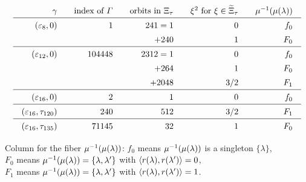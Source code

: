 \documentclass{amsart} %
\begin{document}
\begin{table}
\[
\setlength{\arraycolsep}{10pt}
\renewcommand{\arraystretch}{1.4}
\begin{array}{rrrrr}
\gamma &\textrm{index of $\vGam$} &\textrm{orbits in $\Xitau$} & \xi^2 \textrm{ for } \xi\in \tilXitau&\mu\inv(\mu(\lambda))\\
\hline 
(\vep_8, 0)     &1 & 241= 1  & 0 & f_0 \\
                       & &      +240  & 1 & F_0 \\
\hline 
(\vep_{12}, 0) &104448 & 2312= 1  & 0 & f_0 \\
                      & &       +264  & 1 & F_0 \\
                      & &      +2048  & 3/2 & F_1 \\
 \hline 
(\vep_{16}, 0) &2&  1  & 0 & f_0 \\
\hline 
(\vep_{16}, \tau_{120}) &240&  512  & 3/2 & F_1 \\
\hline 
(\vep_{16}, \tau_{135}) &71145 &  32  & 1 & F_0 \\                  
\end{array}
\]
\vskip 3mm
%
\parbox{12cm}{
Column for the fiber $\mu^{-1}(\mu(\lambda))$: 
$f_0$ means $\mu^{-1}(\mu(\lambda))$ is a singleton $\{\lambda\}$,
\\
$ F_0$  means $\mu^{-1}(\mu(\lambda))=\{\lambda, \lambda^{\prime}\}$ with $\langle r(\lambda), r(\lambda^{\prime}) \rangle=0$, 
\\
$ F_1$  means $\mu^{-1}(\mu(\lambda))=\{\lambda, \lambda^{\prime}\}$ with $\langle r(\lambda), r(\lambda^{\prime}) \rangle=1$.
}
%

\vskip 5mm
\caption{Index $[\OG(\Lplus, \PPPplus): \vGam]$  and orbit decomposition of walls}\label{table:Xis}
\end{table}

\end{document}
